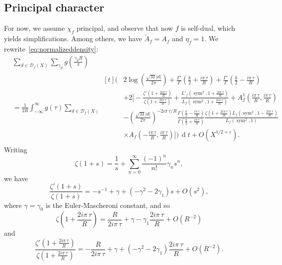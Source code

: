 \documentclass[11pt,reqno]{amsart} \usepackage{fullpage}
\newcommand{\vep}{\varepsilon}
\renewcommand{\d}[1]{\,\operatorname*{d}\!{#1}}
\newcommand\be{\begin{equation}}
\newcommand\ee{\end{equation}}
\DeclareMathOperator{\sym}{sym}
\newcommand{\D}{\mathcal D_f}
\numberwithin{equation}{section}
\begin{document}
\subsection{Principal character}\label{subsec:pc}
For now, we assume $\chi_f$ principal, and observe that now $f$ is self-dual,
which yields simplifications. Among others, we have $\tilde A_f=A_f$ and $\eta_f=1$.
We rewrite~\eqref{eq:normalizeddensity}:
\be\label{eq:principalnormalizeddensity}\begin{aligned}
  &\sum_{d\in\D(X)}
  \sum_{\gamma_d}g\left(\frac{\gamma_d R}\pi\right) \\
  &=\frac1{2R}\int_{-\infty}^\infty g(\tau)\sum_{d\in\D(X)}
  \begin{aligned}[t]\Bigg(
    &2\log\left(\frac{\sqrt M|d|}{2\pi}\right)
    +\frac{\Gamma'}{\Gamma}\left(\frac k2+\frac{i\pi\,\tau}{R}\right)
    +\frac{\Gamma'}{\Gamma}\left(\frac k2-\frac{i\pi\,\tau}{R}\right) \\
    &+2\Bigg[-\frac{\zeta'\left(1+\frac{2i\pi\,\tau}{R}\right)}
    {\zeta\left(1+\frac{2i\pi\,\tau}{R}\right)}
    +\frac{L'_f\left(\sym^2,1+\frac{2i\pi\,\tau}{R}\right)}
    {L_f\left(\sym^2,1+\frac{2i\pi\,\tau}{R}\right)}
    +A_f^1\left(\frac{i\pi\,\tau}{R},\frac{i\pi\,\tau}{R}\right) \\
    &-\left(\frac{\sqrt M |d|}{2\pi}\right)^{-2i\pi\,\tau/R}
    \frac{\Gamma\left(\frac k2-\frac{i\pi\,\tau}{R}\right)}
    {\Gamma\left(\frac k2+\frac{i\pi\,\tau}{R}\right)}
    \frac{\zeta\left(1+\frac{2i\pi\,\tau}{R}\right)
      L_f\left(\sym^2,1-\frac{2i\pi\,\tau}{R}\right)}{L_f(\sym^2,1)} \\
    &\times{A}_f\left(-\frac{i\pi\,\tau}{R},\frac{i\pi\,\tau}{R}\right)
    \Bigg]
    \Bigg) \d t
    +O(X^{1/2+\vep}).\end{aligned}
\end{aligned}\ee
Writing
\be\zeta(1+s)=\frac1 s+\sum_{n=0}^\infty\frac{(-1)^n}{n!}\gamma_n s^n,\ee
we have
\be
\frac{\zeta'(1+s)}{\zeta(1+s)}=-s^{-1}+\gamma+(-\gamma^2-2\gamma_1)s+O(s^2),
\ee
where $\gamma=\gamma_0$ is the Euler-Mascheroni constant, and so
\be\zeta\left(1+\frac{2i\pi\,\tau}{R}\right)
=\frac{R}{2i\pi\,\tau}+\gamma-\gamma_1\frac{2i\pi\,\tau}{R}+O\left(R^{-2}\right)\ee
and
\be
\frac{\zeta'\left(1+\frac{2i\pi\,\tau}{R}\right)}
{\zeta\left(1+\frac{2i\pi\,\tau}{R}\right)}
=-\frac{R}{2i\pi\,\tau}+\gamma+(-\gamma^2-2\gamma_1)\frac{2i\pi\,\tau}{R}
+O\left(R^{-2}\right).\ee
\end{document}
